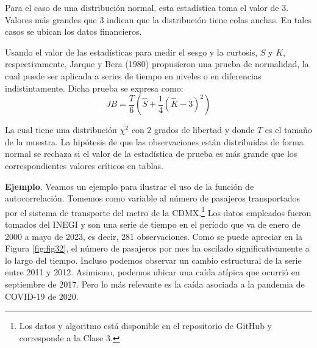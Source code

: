 \documentclass[
]{book}
\begin{document}
Para el caso de una distribución normal, esta estadística toma el valor de 3. Valores más grandes que 3 indican que la distribución tiene colas anchas. En tales casos se ubican los datos financieros.

Usando el valor de las estadísticas para medir el sesgo y la curtosis, \(S\) y \(K\), respectivamente, Jarque y Bera (1980) propusieron una prueba de normalidad, la cual puede ser aplicada a series de tiempo en niveles o en diferencias indistintamente. Dicha prueba se expresa como:
\begin{equation}
    JB = \frac{T}{6} \left(\hat{S} + \frac{1}{4} (\hat{K} - 3)^2 \right) 
    \label{eq:eqautocorr8}
\end{equation}

La cual tiene una distribución \(\chi^2\) con \(2\) grados de libertad y donde \(T\) es el tamaño de la muestra. La hipótesis de que las observaciones están distribuidas de forma normal se rechaza si el valor de la estadística de prueba es más grande que los correspondientes valores críticos en tablas.

\textbf{Ejemplo}. Veamos un ejemplo para ilustrar el uso de la función de autocorrelación. Tomemos como variable al número de pasajeros transportados por el sistema de transporte del metro de la CDMX.\footnote{Los datos y algoritmo está disponible en el repositorio de GitHub y corresponde a la Clase 3.} Los datos empleados fueron tomados del INEGI y son una serie de tiempo en el período que va de enero de 2000 a mayo de 2023, es decir, 281 observaciones. Como se puede apreciar en la Figura \ref{fig:fig32}, el número de pasajeros por mes ha oscilado significativamente a lo largo del tiempo. Incluso podemos observar un cambio estructural de la serie entre 2011 y 2012. Asimismo, podemos ubicar una caída atípica que ocurrió en septiembre de 2017. Pero lo más relevante es la caída asociada a la pandemia de COVID-19 de 2020.
\end{document}
